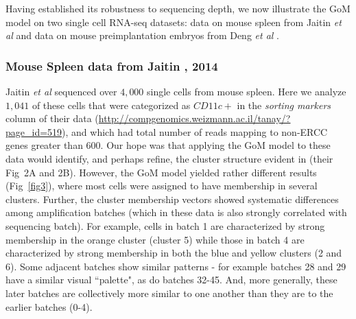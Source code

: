 \documentclass[10pt,letterpaper]{article}
\begin{document}
Having established its robustness to sequencing depth, we now illustrate the GoM model on two single cell RNA-seq datasets: data on mouse spleen from Jaitin \textit{et al} \cite{Jaitin2014} and data on mouse preimplantation embryos from Deng \textit{et al} \cite{Deng2014}.


\subsubsection*{Mouse Spleen data from Jaitin , 2014}

Jaitin \textit{et al} sequenced over $4,000$ single cells from mouse spleen. Here we analyze $1,041$ of these cells that were categorized as $CD11c+$ in the \textit{sorting markers} column of their data (\url{http://compgenomics.weizmann.ac.il/tanay/?page_id=519}), and which had total number of reads mapping to non-ERCC genes greater than $600$. Our hope was that applying the GoM model to these data would identify, and perhaps refine, the cluster structure evident in \cite{Jaitin2014} (their Fig~2A and 2B). However, the GoM model yielded rather different results (Fig~\ref{fig3}), where most cells were assigned to have membership in several clusters. Further, the cluster membership vectors showed systematic differences among amplification batches (which in these data is also strongly correlated with sequencing batch). For example, cells in batch 1 are characterized by strong membership in the orange cluster (cluster 5) while those in batch 4 are characterized
by strong membership in both the blue and yellow clusters (2 and 6). Some adjacent batches show similar patterns - for example batches 28 and 29 have a similar visual ``palette", as do batches 32-45. And, more generally, these later batches are collectively more similar to one another than they are to the earlier batches (0-4).

\end{document}
